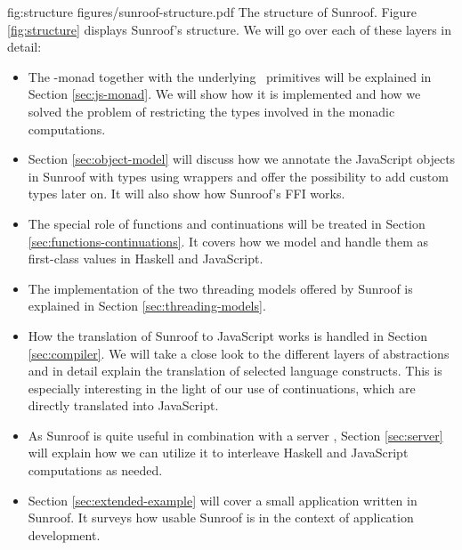 \Figure%
{fig:structure}%
{figures/sunroof-structure.pdf}%
{The structure of Sunroof.}
Figure \ref{fig:structure} displays Sunroof's structure. 
We will go over each of these layers in detail:
\begin{itemize}
\item
The \JS-monad together with the underlying \JSI~primitives 
will be explained in Section \ref{sec:js-monad}. 
We will show how it is implemented and how we solved
the problem of restricting the types involved in the monadic 
computations.
\item
Section \ref{sec:object-model} will discuss how we annotate 
the JavaScript objects in Sunroof with types using wrappers 
and offer the possibility to add custom types later on.
It will also show how Sunroof's FFI works.
\item
The special role of functions and continuations will
be treated in Section \ref{sec:functions-continuations}. 
It covers how we model and handle
them as first-class values in Haskell and JavaScript.
\item
The implementation of the two threading models offered by Sunroof is explained 
in Section \ref{sec:threading-models}.
\item
How the translation of Sunroof to JavaScript works is handled in 
Section \ref{sec:compiler}. We will take a close look to the
different layers of abstractions and in detail explain the 
translation of selected language constructs. This is 
especially interesting in the light of our use of continuations, which
are directly translated into JavaScript.
\item
As Sunroof is quite useful in combination with a server \cite{Farmer:12:WebDSLs},
Section \ref{sec:server} will explain how we can utilize it 
to interleave Haskell and JavaScript computations as needed.
\item
Section \ref{sec:extended-example} will cover a small application 
written in Sunroof. 
It surveys how usable Sunroof is in the context of application development. 
\end{itemize}

